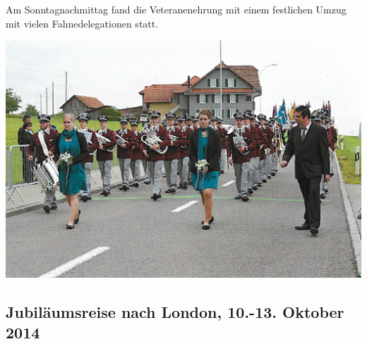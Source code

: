 \begin{history}
    Am Sonntagnachmittag fand die Veteranenehrung mit einem festlichen Umzug mit
    vielen Fahnedelegationen statt.

    \begin{MulticolFigure}
        \centering
        \includegraphics[width=0.93\linewidth]{./chap/2001-2024/2013/MGH-Umzug.jpg}
    \end{MulticolFigure}

\end{history}

\subsection*{Jubiläumsreise nach London, 10.-13. Oktober 2014}

